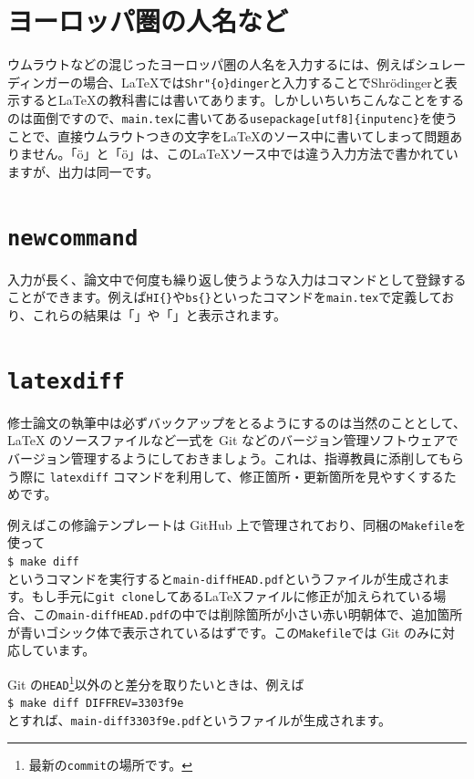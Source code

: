 \section{ヨーロッパ圏の人名など}
ウムラウトなどの混じったヨーロッパ圏の人名を入力するには、例えばシュレーディンガーの場合、\LaTeX{}では\texttt{Shr\bs{}"\{o\}dinger}と入力することでShr\"{o}dingerと表示すると\LaTeX{}の教科書には書いてあります。しかしいちいちこんなことをするのは面倒ですので、\texttt{main.tex}に書いてある\texttt{\bs{}usepackage[utf8]\{inputenc\}}を使うことで、直接ウムラウトつきの文字を\LaTeX{}のソース中に書いてしまって問題ありません。「ö」と「\"{o}」は、この\LaTeX{}ソース中では違う入力方法で書かれていますが、出力は同一です。

\section{\texttt{newcommand}}

入力が長く、論文中で何度も繰り返し使うような入力はコマンドとして登録することができます。例えば\texttt{\bs{}HI\{\}}や\texttt{\bs{}bs\{\}}といったコマンドを\texttt{main.tex}で定義しており、これらの結果は「\HI{}」や「\bs{}」と表示されます。

\section{\texttt{latexdiff}}

修士論文の執筆中は必ずバックアップをとるようにするのは当然のこととして、\LaTeX{} のソースファイルなど一式を Git などのバージョン管理ソフトウェアでバージョン管理するようにしておきましょう。これは、指導教員に添削してもらう際に \texttt{latexdiff} コマンドを利用して、修正箇所・更新箇所を見やすくするためです。

例えばこの修論テンプレートは GitHub 上で管理されており、同梱の\texttt{Makefile}を使って\\
\texttt{\$ make diff}\\
というコマンドを実行すると\texttt{main-diffHEAD.pdf}というファイルが生成されます。もし手元に\texttt{git clone}してある\LaTeX{}ファイルに修正が加えられている場合、この\texttt{main-diffHEAD.pdf}の中では削除箇所が小さい赤い明朝体で、追加箇所が青いゴシック体で表示されているはずです。この\texttt{Makefile}では Git のみに対応しています。

Git の\texttt{HEAD}\footnote{最新の\texttt{commit}の場所です。}以外のと差分を取りたいときは、例えば\\
\texttt{\$ make diff DIFFREV=3303f9e}\\
とすれば、\texttt{main-diff3303f9e.pdf}というファイルが生成されます。
